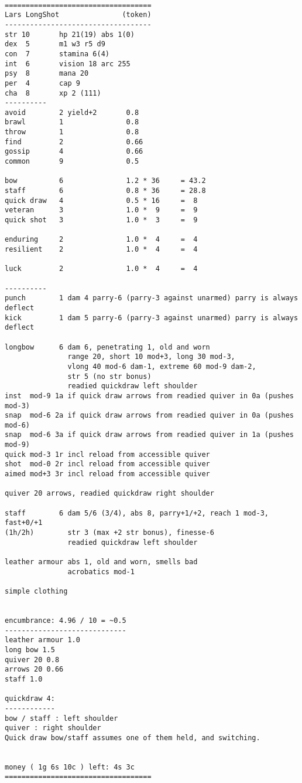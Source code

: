 \

\goodbreak
\tiny \begin{samepage} \begin{verbatim}
===================================
Lars LongShot               (token)
-----------------------------------
str 10       hp 21(19) abs 1(0)
dex  5       m1 w3 r5 d9
con  7       stamina 6(4)
int  6       vision 18 arc 255
psy  8       mana 20
per  4       cap 9
cha  8       xp 2 (111)
----------
avoid        2 yield+2       0.8
brawl        1               0.8
throw        1               0.8
find         2               0.66
gossip       4               0.66
common       9               0.5

bow          6               1.2 * 36     = 43.2
staff        6               0.8 * 36     = 28.8
quick draw   4               0.5 * 16     =  8
veteran      3               1.0 *  9     =  9
quick shot   3               1.0 *  3     =  9

enduring     2               1.0 *  4     =  4
resilient    2               1.0 *  4     =  4

luck         2               1.0 *  4     =  4

----------
punch        1 dam 4 parry-6 (parry-3 against unarmed) parry is always deflect
kick         1 dam 5 parry-6 (parry-3 against unarmed) parry is always deflect

longbow      6 dam 6, penetrating 1, old and worn
               range 20, short 10 mod+3, long 30 mod-3,
               vlong 40 mod-6 dam-1, extreme 60 mod-9 dam-2,
               str 5 (no str bonus)
               readied quickdraw left shoulder
inst  mod-9 1a if quick draw arrows from readied quiver in 0a (pushes mod-3)
snap  mod-6 2a if quick draw arrows from readied quiver in 0a (pushes mod-6)
snap  mod-6 3a if quick draw arrows from readied quiver in 1a (pushes mod-9)
quick mod-3 1r incl reload from accessible quiver
shot  mod-0 2r incl reload from accessible quiver
aimed mod+3 3r incl reload from accessible quiver

quiver 20 arrows, readied quickdraw right shoulder

staff        6 dam 5/6 (3/4), abs 8, parry+1/+2, reach 1 mod-3, fast+0/+1
(1h/2h)        str 3 (max +2 str bonus), finesse-6
               readied quickdraw left shoulder

leather armour abs 1, old and worn, smells bad
               acrobatics mod-1

simple clothing


encumbrance: 4.96 / 10 = ~0.5
-----------------------------
leather armour 1.0
long bow 1.5
quiver 20 0.8
arrows 20 0.66
staff 1.0

quickdraw 4:
------------
bow / staff : left shoulder
quiver : right shoulder
Quick draw bow/staff assumes one of them held, and switching.


money ( 1g 6s 10c ) left: 4s 3c
===================================
\end{verbatim} \end{samepage} \normalsize


